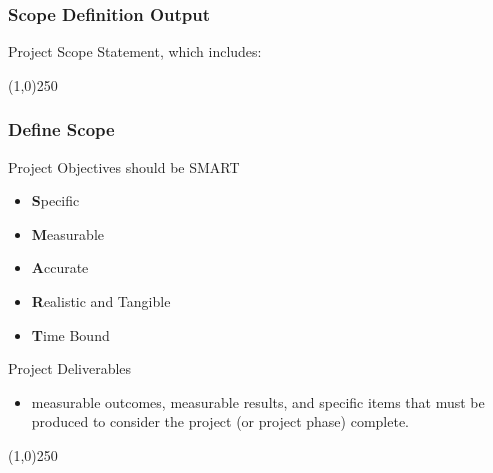 \begin{frame}
\frametitle{Scope Definition \hfill Output}
Project Scope Statement, which includes:\\ 

\begin{table}
\end{table}

\end{frame}\begin{center}\line(1,0){250}\end{center}



\begin{frame}
\frametitle{Define Scope}
Project Objectives should be SMART
\begin{itemize}
	\item \textbf{S}pecific
	\item \textbf{M}easurable
	\item \textbf{A}ccurate
	\item \textbf{R}ealistic and Tangible
	\item \textbf{T}ime Bound
\end{itemize}
Project Deliverables  
\begin{itemize}
	\item measurable outcomes, measurable results, and specific items that must be produced to consider the project (or project phase) complete. 
\end{itemize}
\end{frame}\begin{center}\line(1,0){250}\end{center}



